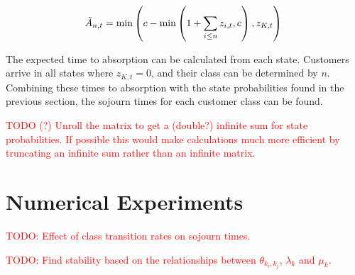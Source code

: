 \documentclass{article}
\begin{document}
\begin{equation}\label{eqn:inservice_adapt_tilde}
\tilde{A}_{n,t} =
\min\left(c - \min\left(1 + \sum_{i \leq n} z_{i,t}, c\right), z_{K,t}\right) \\
\end{equation}

The expected time to absorption can be calculated from each state.
Customers arrive in all states where $z_{K,t} = 0$, and their class can be
determined by $n$. Combining these times to absorption with the state
probabilities found in the previous section, the sojourn times for each customer
class can be found.

\textcolor{red}{TODO (?) Unroll the matrix to get a (double?) infinite sum for state probabilities. If possible this would make calculations much more efficient by truncating an infinite sum rather than an infinite matrix.}

\section{Numerical Experiments}

\textcolor{red}{TODO: Effect of class transition rates on sojourn times.}

\textcolor{red}{TODO: Find stability based on the relationships between $\theta_{k_i,k_j}$, $\lambda_k$ and $\mu_k$.}



\end{document}
